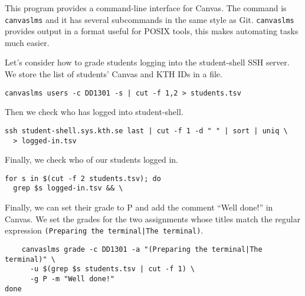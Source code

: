 
This program provides a command-line interface for Canvas.
The command is \texttt{canvaslms} and it has several subcommands in the same 
style as Git.
\texttt{canvaslms} provides output in a format useful for POSIX tools, this 
makes automating tasks much easier.

Let's consider how to grade students logging into the student-shell SSH server.
We store the list of students' Canvas and KTH IDs in a file.
\begin{verbatim}
canvaslms users -c DD1301 -s | cut -f 1,2 > students.tsv
\end{verbatim}
Then we check who has logged into student-shell.
\begin{verbatim}
ssh student-shell.sys.kth.se last | cut -f 1 -d " " | sort | uniq \
  > logged-in.tsv
\end{verbatim}
Finally, we check who of our students logged in.
\begin{verbatim}
for s in $(cut -f 2 students.tsv); do
  grep $s logged-in.tsv && \
\end{verbatim}
Finally, we can set their grade to P and add the comment \enquote{Well done!} 
in Canvas.
We set the grades for the two assignments whose titles match the regular 
expression \texttt{(Preparing the terminal|The terminal)}.
\begin{verbatim}
    canvaslms grade -c DD1301 -a "(Preparing the terminal|The terminal)" \
      -u $(grep $s students.tsv | cut -f 1) \
      -g P -m "Well done!"
done
\end{verbatim}

